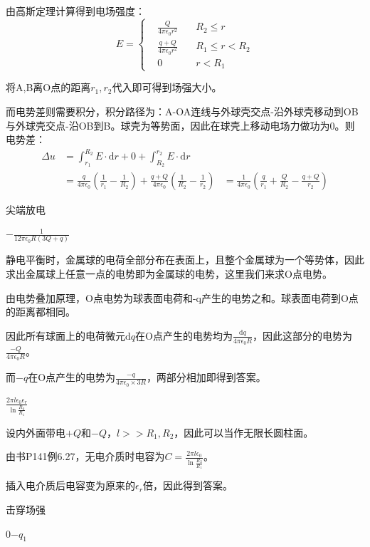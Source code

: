 \documentclass[b5paper,opensource,sourcefont,parskip]{qyxf-book}
\newcommand{\di}[1]{\mathrm{d}#1}
\begin{document}
\solve 由高斯定理计算得到电场强度：
\begin{equation}
E=\left\{
\begin{aligned}
&\frac{Q}{4\pi\epsilon_0 r^2}\quad &R_2\leqslant r\\
&\frac{q+Q}{4\pi\epsilon_0 r^2}\quad &R_1\leqslant r<R_2\\
&0	&r<R_1
\end{aligned}
\right.
\end{equation}

将A,B离O点的距离$ r_1,r_2 $代入即可得到场强大小。

而电势差则需要积分，积分路径为：A-OA连线与外球壳交点-沿外球壳移动到OB与外球壳交点-沿OB到B。球壳为等势面，因此在球壳上移动电场力做功为0。则电势差：
\begin{align*}
\Delta u&=\int_{r_1}^{R_2}E\cdot\di{r}+0+\int_{R_2}^{r_2}E\cdot\di{r}\\
&=\frac{q}{4\pi\epsilon_0}\left(\frac{1}{r_1}-\frac{1}{R_2}\right)+\frac{q+Q}{4\pi\epsilon_0}\left(\frac{1}{R_2}-\frac{1}{r_2}\right)
&=\frac{1}{4\pi\epsilon_0}\left(\frac{q}{r_1}+\frac{Q}{R_2}-\frac{q+Q}{r_2}\right)
\end{align*}

 尖端放电

 $ -\frac{1}{12\pi\epsilon_0 R(3Q+q)} $

\solve 静电平衡时，金属球的电荷全部分布在表面上，且整个金属球为一个等势体，因此求出金属球上任意一点的电势即为金属球的电势，这里我们来求O点电势。

由电势叠加原理，O点电势为球表面电荷和-q产生的电势之和。球表面电荷到O点的距离都相同。

因此所有球面上的电荷微元$\di{q}$在O点产生的电势均为$\frac{\di{q}}{4\pi\epsilon_0 R}$，因此这部分的电势为$\frac{-Q}{4\pi\epsilon_0 R}$。

而$ -q $在O点产生的电势为$\frac{-q}{4\pi\epsilon_0 \times 3R}$，两部分相加即得到答案。

 $\frac{2\pi l\epsilon_0\epsilon_r}{\ln \frac{R_2}{R_1}}$

\solve 设内外面带电$ +Q $和$ -Q $，$ l>>R_1,R_2 $，因此可以当作无限长圆柱面。

由书P141例6.27，无电介质时电容为$ C=\frac{2\pi l\epsilon_0}{\ln \frac{R_2}{R_1}} $。

插入电介质后电容变为原来的$ \epsilon_r $倍，因此得到答案。

 击穿场强

 $ 0 $\quad$ -q_1 $
\end{document}
